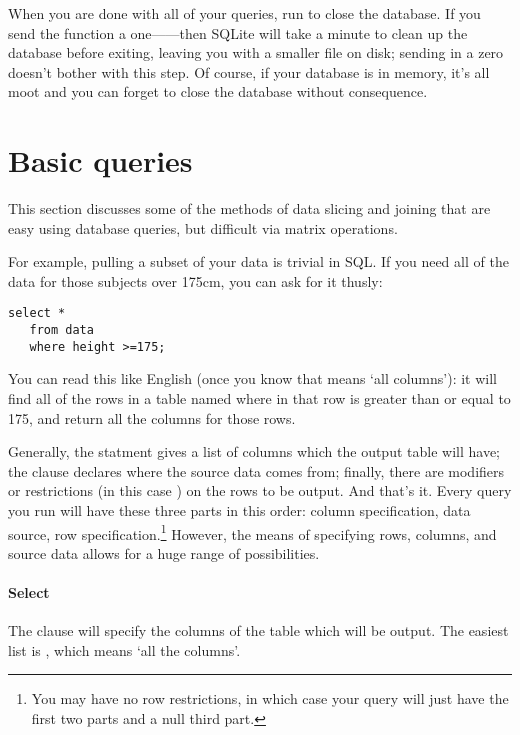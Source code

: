 When you are done with all of your queries, run
 to close the database. If you send the function a
one------then SQLite will take a minute to clean
up the database before exiting, leaving you with a smaller file on disk;
sending in a zero doesn't bother with this step. Of course, if your
database is in memory, it's all moot and you can forget to close the
database without consequence.

\section{Basic queries}
This section discusses some of the methods of data slicing and joining
that are easy using database queries, but difficult via
matrix operations.

For example, pulling a subset of your data is trivial in SQL. If
you need all of the data for those subjects over 175cm, you can ask for
it thusly:

\begin{lstlisting}
select * 
   from data 
   where height >=175;
\end{lstlisting}

You can read this like English (once you know that \sinline{*} means `all
columns'): it will find all of the rows in a table named 
where  in that row is greater than or equal to 175, and
return all the columns for those rows.


Generally, the  statment gives a list of columns which the output
table will have; the  clause declares where the source data
comes from; finally, there are modifiers or restrictions (in this case
) on the rows to be output.  And that's it. Every query
you run will have these three parts in this order: column specification, data source,
row specification.\footnote{You may have
no row restrictions, in which case your query will just have the first
two parts and a null third part.} However, the means of specifying rows, columns, and
source data allows for a huge range of possibilities.

\paragraph{Select}
The  clause will specify the columns of the table which will
be output. The easiest list is \sinline{*}, which means `all the columns'.

